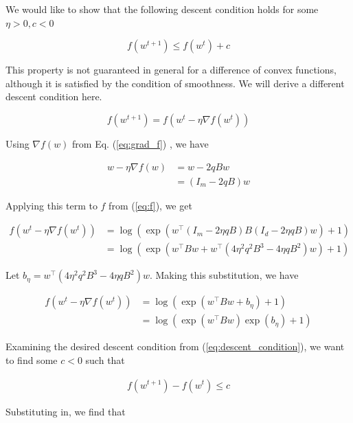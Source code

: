 \documentclass[11pt]{article}
\begin{document}
We would like to show that the following descent condition holds for some $\eta > 0, c < 0$

\begin{equation}
\label{eq:descent_condition}
    f(w^{t+1}) \leq f(w^t) + c
\end{equation}

This property is not guaranteed in general for a difference of convex functions, although it is satisfied by the condition of smoothness. We will derive a different descent condition here.

\begin{equation}
    f(w^{t+1}) = f(w^t - \eta \nabla f(w^t)) 
\end{equation}

Using $\nabla f(w)$ from Eq. (\ref{eq:grad_f}) , we have

\begin{align*}
    w - \eta \nabla f(w) &= w - 2qBw \\
    &= (I_m - 2qB)w
\end{align*}

Applying this term to $f$ from (\ref{eq:f}), we get

\begin{equation}
\begin{split}
    f(w^t - \eta \nabla f(w^t)) 
    &= \log(\exp(w^{\top}(I_m - 2 \eta qB)B(I_d - 2 \eta qB)w) + 1) \\
    &= \log(\exp(w^{\top}Bw + w^{\top} ( 4 \eta^2 q^2 B^3 - 4 \eta q B^2)w) + 1)
\end{split}
\end{equation}

Let $b_\eta = w^{\top} ( 4 \eta^2 q^2 B^3 - 4 \eta q B^2)w$. Making this substitution, we have

\begin{equation}
\begin{split}
    f(w^t - \eta \nabla f(w^t)) 
    &= \log(\exp(w^{\top}Bw + b_\eta ) + 1) \\
    &= \log(\exp(w^{\top}Bw)\exp(b_\eta ) + 1)
\end{split}
\end{equation}

Examining the desired descent condition from (\ref{eq:descent_condition}), we want to find some $c < 0$ such that

\begin{align*}
    f(w^{t+1}) - f(w^t) \leq c
\end{align*}

Substituting in, we find that
\end{document}
